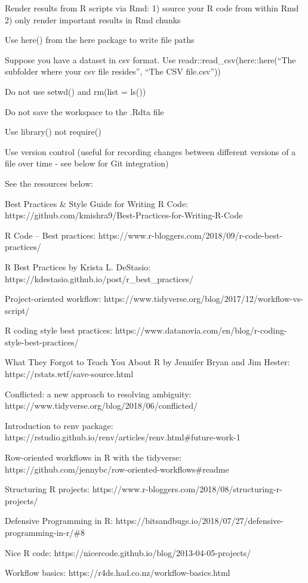 \documentclass[
  letterpaper,
  DIV=11,
  numbers=noendperiod]{scrreport}
\begin{document}
Render results from R scripts via Rmd: 1) source your R code from within
Rmd 2) only render important results in Rmd chunks

Use here() from the here package to write file paths

Suppose you have a dataset in csv format. Use
readr::read\_csv(here::here(``The subfolder where your csv file
resides'', ``The CSV file.csv''))

Do not use setwd() and rm(list = ls())

Do not save the workspace to the .Rdta file

Use library() not require()

Use version control (useful for recording changes between different
versions of a file over time - see below for Git integration)

See the resources below:

Best Practices \& Style Guide for Writing R Code:
https://github.com/kmishra9/Best-Practices-for-Writing-R-Code

R Code -- Best practices:
https://www.r-bloggers.com/2018/09/r-code-best-practices/

R Best Practices by Krista L. DeStasio:
https://kdestasio.github.io/post/r\_best\_practices/

Project-oriented workflow:
https://www.tidyverse.org/blog/2017/12/workflow-vs-script/

R coding style best practices:
https://www.datanovia.com/en/blog/r-coding-style-best-practices/

What They Forgot to Teach You About R by Jennifer Bryan and Jim Hester:
https://rstats.wtf/save-source.html

Conflicted: a new approach to resolving ambiguity:
https://www.tidyverse.org/blog/2018/06/conflicted/

Introduction to renv package:
https://rstudio.github.io/renv/articles/renv.html\#future-work-1

Row-oriented workflows in R with the tidyverse:
https://github.com/jennybc/row-oriented-workflows\#readme

Structuring R projects:
https://www.r-bloggers.com/2018/08/structuring-r-projects/

Defensive Programming in R:
https://bitsandbugs.io/2018/07/27/defensive-programming-in-r/\#8

Nice R code: https://nicercode.github.io/blog/2013-04-05-projects/

Workflow basics: https://r4ds.had.co.nz/workflow-basics.html
\end{document}
